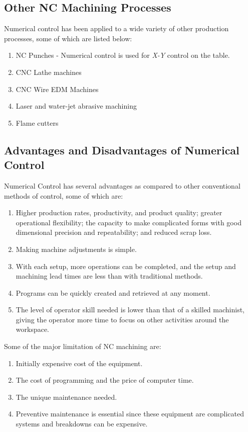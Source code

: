 \subsection{Other NC Machining Processes}
Numerical control has been applied to a wide variety of other production processes, some of which are listed below\cite{Black2011}:
\begin{enumerate}
	\item NC Punches - Numerical control is used for \textit{X-Y} control on the table.
	\item CNC Lathe machines
	\item CNC Wire EDM Machines
	\item Laser and water-jet abrasive machining
	\item Flame cutters
\end{enumerate}
\subsection{Advantages and Disadvantages of Numerical Control}
Numerical Control has several advantages as compared to other conventional methods of control, some of which are\cite{Kalpakjian2010}:
\begin{enumerate}
	\item Higher production rates, productivity, and product quality; greater operational flexibility; the capacity to make complicated forms with good dimensional precision and repeatability; and reduced scrap loss.
	\item Making machine adjustments is simple.
	\item With each setup, more operations can be completed, and the setup and machining lead times are less than with traditional methods.
	\item Programs can be quickly created and retrieved at any moment.
	\item The level of operator skill needed is lower than that of a skilled machinist, giving the operator more time to focus on other activities around the workspace.
\end{enumerate}
Some of the major limitation of NC machining are:
\begin{enumerate}
	\item Initially expensive cost of the equipment.
	\item The cost of programming and the price of computer time.
	\item The unique maintenance needed.
	\item Preventive maintenance is essential since these equipment are complicated systems and breakdowns can be expensive.
\end{enumerate}